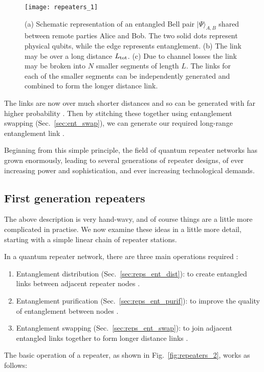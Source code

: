 \begin{figure}[!htb]
\texttt{[image: repeaters\_1]}
\caption{(a) Schematic representation of an entangled Bell pair $| \Psi\rangle_{A,B}$ shared between remote parties Alice and Bob. The two solid dots represent physical qubits, while the edge represents entanglement. (b) The link may be over a long distance $L_{\rm tot}$. (c) Due to channel losses the link may be broken into $N$ smaller segments of length $L$. The links for each of the smaller segments can be independently generated and combined to form the longer distance link.} 
\label{fig:repeaters_1}
\end{figure} 

The links are now over much shorter distances and so can be generated with far higher probability \cite{}. Then by stitching these together using entanglement swapping (Sec.~\ref{sec:ent_swap}), we can generate our required long-range entanglement link \cite{}.

Beginning from this simple principle, the field of quantum repeater networks has grown enormously, leading to several generations of repeater designs, of ever increasing power and sophistication, and ever increasing technological demands.

\subsection{First generation repeaters}

The above description is very hand-wavy, and of course things are a little more complicated in practise. We now examine these ideas in a little more detail, starting with a simple linear chain of repeater stations. 

In a quantum repeater network, there are three main operations required \cite{}:
\begin{enumerate}
\item Entanglement distribution (Sec.~\ref{sec:reps_ent_dist}): to create entangled links between adjacent repeater nodes \cite{}.
\item Entanglement purification (Sec.~\ref{sec:reps_ent_purif}): to improve the quality of entanglement between nodes \cite{}.
\item Entanglement swapping (Sec.~\ref{sec:reps_ent_swap}): to join adjacent entangled links together to form longer distance links \cite{}.
\end{enumerate}
The basic operation of a repeater, as shown in Fig.~\ref{fig:repeaters_2}, works as follows:

